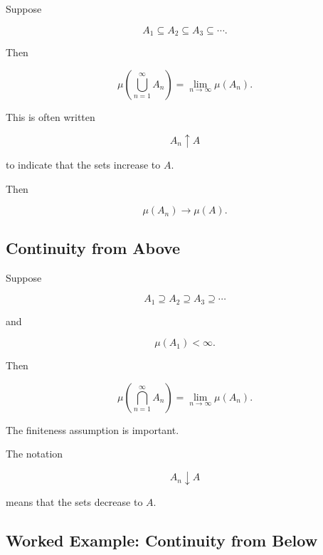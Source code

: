 \begin{theorem}
Suppose

\[
A_1\subseteq A_2\subseteq A_3\subseteq\cdots.
\]

Then

\[
\boxed{
\mu\left(
\bigcup_{n=1}^{\infty}A_n
\right)
=
\lim_{n\to\infty}\mu(A_n).
}
\]
\end{theorem}

This is often written

\[
A_n\uparrow A
\]

to indicate that the sets increase to \(A\).

Then

\[
\boxed{
\mu(A_n)\to\mu(A).
}
\]

\subsection{Continuity from Above}
\label{subsec:continuity-from-above-measure}

\begin{theorem}
Suppose

\[
A_1\supseteq A_2\supseteq A_3\supseteq\cdots
\]

and

\[
\mu(A_1)<\infty.
\]

Then

\[
\boxed{
\mu\left(
\bigcap_{n=1}^{\infty}A_n
\right)
=
\lim_{n\to\infty}\mu(A_n).
}
\]
\end{theorem}

The finiteness assumption is important.

The notation

\[
A_n\downarrow A
\]

means that the sets decrease to \(A\).

\subsection{Worked Example: Continuity from Below}
\label{subsec:worked-continuity-below}

